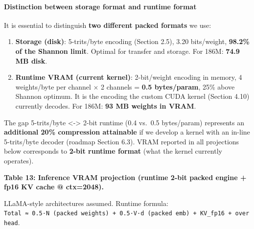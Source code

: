 \paragraph{Distinction between storage format and runtime
format}\label{distinction-between-storage-format-and-runtime-format}

It is essential to distinguish \textbf{two different packed formats} we
use:

\begin{enumerate}
\def\labelenumi{\arabic{enumi}.}
\item
  \textbf{Storage (disk)}: 5-trits/byte encoding (Section 2.5), 3.20
  bits/weight, \textbf{98.2\% of the Shannon limit}. Optimal for
  transfer and storage. For 186M: \textbf{74.9 MB disk}.
\item
  \textbf{Runtime VRAM (current kernel)}: 2-bit/weight encoding in
  memory, 4 weights/byte per channel × 2 channels = \textbf{0.5
  bytes/param}, 25\% above Shannon optimum. It is the encoding the
  custom CUDA kernel (Section 4.10) currently decodes. For 186M:
  \textbf{93 MB weights in VRAM}.
\end{enumerate}

The gap 5-trits/byte <-> 2-bit runtime (0.4 vs.~0.5 bytes/param)
represents an \textbf{additional 20\% compression attainable} if we
develop a kernel with an in-line 5-trits/byte decoder (roadmap Section
6.3). VRAM reported in all projections below corresponds to
\textbf{2-bit runtime format} (what the kernel currently operates).

\textbf{Table 13: Inference VRAM projection (runtime 2-bit packed engine
+ fp16 KV cache @ ctx=2048).}

LLaMA-style architectures assumed. Runtime formula:
\texttt{Total\ ≈\ 0.5·N\ (packed\ weights)\ +\ 0.5·V·d\ (packed\ emb)\ +\ KV\_fp16\ +\ overhead}.


